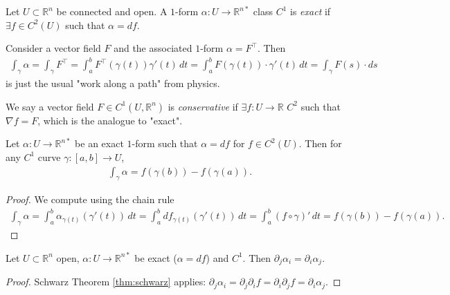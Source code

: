 \begin{definition}\label{def:con-vec-field}
	Let $U \subset \mathbb{R}^{n}$ be connected and open. A $1$-form $\alpha : U \to \mathbb{R}^{n*}$ class $C^{1}$ is \textit{exact} if $\exists f \in C^{2}(U)$ such that $\alpha = df$.
\end{definition}

\begin{remark}
	Consider a vector field $F$ and the associated $1$-form $\alpha = F^\top$. Then
	\begin{align*}
		\int_{\gamma } \alpha = \int_{\gamma } F^\top = \int_{a}^{b} F^\top (\gamma (t)) \gamma '(t) \, dt = \int_{a}^{b} F(\gamma (t)) \cdot \gamma '(t) \, dt = \int_{\gamma } F(s) \cdot ds
	\end{align*}
	is just the usual "work along a path" from physics.

	We say a vector field $F \in C^{1}(U, \mathbb{R}^{n})$ is \textit{conservative} if $\exists f: U \to \mathbb{R}$ $C^{2}$ such that $\nabla f = F$, which is the analogue to "exact".
\end{remark}


\begin{lemma}\label{lem:path-indep}
	Let $\alpha : U \to \mathbb{R}^{n*}$ be an exact $1$-form such that $\alpha = df$ for $f \in C^{2}(U)$. Then for any $C^{1}$ curve $\gamma: [a,b] \to U$,
	\begin{align*}
		\int_{\gamma } \alpha = f(\gamma (b)) - f(\gamma (a)).
	\end{align*}
\end{lemma}
\begin{proof}
	We compute using the chain rule
	\begin{align*}
		\int_{\gamma } \alpha  = \int_{a}^{b} \alpha_{\gamma (t)}(\gamma '(t)) \, dt = \int_{a}^{b} df_{\gamma (t)} (\gamma '(t)) \, dt = \int_{a}^{b} (f \circ \gamma )' \, dt = f(\gamma (b)) - f(\gamma (a)).
	\end{align*}
\end{proof}

\begin{lemma}\label{lem:int-cond}
	Let $U \subset \mathbb{R}^{n}$ open, $\alpha : U \to \mathbb{R}^{n*}$ be exact ($\alpha = df$) and $C^{1}$. Then $\partial_{j} \alpha_{i} = \partial_{i} \alpha_{j}$.
\end{lemma}
\begin{proof}
	Schwarz Theorem \ref{thm:schwarz} applies: $\partial_{j} \alpha_{i} = \partial_{j} \partial_{i} f = \partial_{i} \partial_{j} f = \partial_{i} \alpha_{j}$.
\end{proof}

